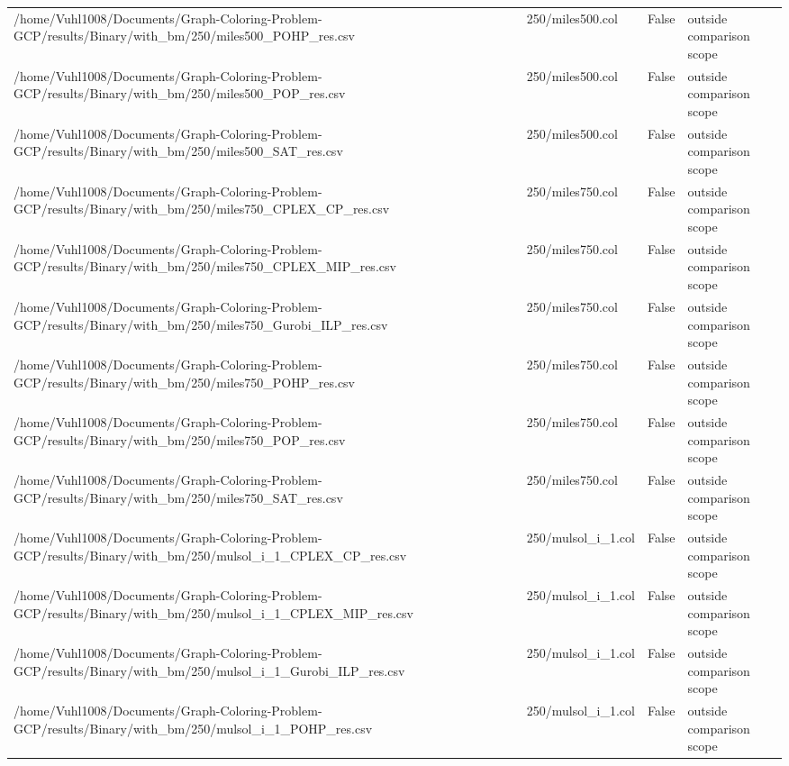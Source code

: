 \begin{table}[htbp]
\begin{tabular}{llll}
/home/Vuhl1008/Documents/Graph-Coloring-Problem-GCP/results/Binary/with\_bm/250/miles500\_POHP\_res.csv & 250/miles500.col & False & outside comparison scope \\
/home/Vuhl1008/Documents/Graph-Coloring-Problem-GCP/results/Binary/with\_bm/250/miles500\_POP\_res.csv & 250/miles500.col & False & outside comparison scope \\
/home/Vuhl1008/Documents/Graph-Coloring-Problem-GCP/results/Binary/with\_bm/250/miles500\_SAT\_res.csv & 250/miles500.col & False & outside comparison scope \\
/home/Vuhl1008/Documents/Graph-Coloring-Problem-GCP/results/Binary/with\_bm/250/miles750\_CPLEX\_CP\_res.csv & 250/miles750.col & False & outside comparison scope \\
/home/Vuhl1008/Documents/Graph-Coloring-Problem-GCP/results/Binary/with\_bm/250/miles750\_CPLEX\_MIP\_res.csv & 250/miles750.col & False & outside comparison scope \\
/home/Vuhl1008/Documents/Graph-Coloring-Problem-GCP/results/Binary/with\_bm/250/miles750\_Gurobi\_ILP\_res.csv & 250/miles750.col & False & outside comparison scope \\
/home/Vuhl1008/Documents/Graph-Coloring-Problem-GCP/results/Binary/with\_bm/250/miles750\_POHP\_res.csv & 250/miles750.col & False & outside comparison scope \\
/home/Vuhl1008/Documents/Graph-Coloring-Problem-GCP/results/Binary/with\_bm/250/miles750\_POP\_res.csv & 250/miles750.col & False & outside comparison scope \\
/home/Vuhl1008/Documents/Graph-Coloring-Problem-GCP/results/Binary/with\_bm/250/miles750\_SAT\_res.csv & 250/miles750.col & False & outside comparison scope \\
/home/Vuhl1008/Documents/Graph-Coloring-Problem-GCP/results/Binary/with\_bm/250/mulsol\_i\_1\_CPLEX\_CP\_res.csv & 250/mulsol\_i\_1.col & False & outside comparison scope \\
/home/Vuhl1008/Documents/Graph-Coloring-Problem-GCP/results/Binary/with\_bm/250/mulsol\_i\_1\_CPLEX\_MIP\_res.csv & 250/mulsol\_i\_1.col & False & outside comparison scope \\
/home/Vuhl1008/Documents/Graph-Coloring-Problem-GCP/results/Binary/with\_bm/250/mulsol\_i\_1\_Gurobi\_ILP\_res.csv & 250/mulsol\_i\_1.col & False & outside comparison scope \\
/home/Vuhl1008/Documents/Graph-Coloring-Problem-GCP/results/Binary/with\_bm/250/mulsol\_i\_1\_POHP\_res.csv & 250/mulsol\_i\_1.col & False & outside comparison scope \\

\end{tabular}
\end{table}
